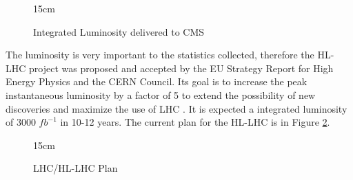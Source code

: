 \begin{figure}[!htm]{15cm}
\caption{Integrated Luminosity delivered to CMS}%
\label{fig:int_lumi}
\end{figure}

The luminosity is very important to the statistics collected, therefore the HL-LHC project was proposed and accepted by the EU Strategy Report for High Energy Physics and the CERN Council. Its goal is to increase the peak instantaneous luminosity by a factor of 5 to extend the possibility of new discoveries and maximize the use of LHC \cite{Aberle:2749422}. It is expected a integrated luminosity of 3000 $fb^{-1}$ in 10-12 years. The current plan for the HL-LHC is in Figure \ref{fig:LHC_Plan}.

\begin{figure}[!htm]{15cm}
\caption{LHC/HL-LHC Plan}%
\label{fig:LHC_Plan}
\end{figure}

